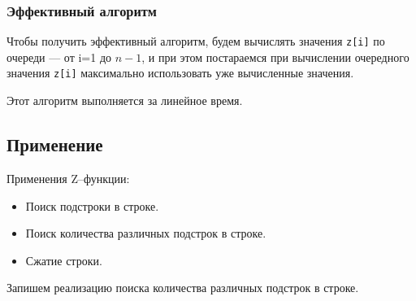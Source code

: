 \subsubsection{Эффективный алгоритм}
Чтобы получить эффективный алгоритм, будем вычислять значения \texttt{z[i]} по очереди — от i=1 до $n-1$, и при этом постараемся при вычислении очередного значения \texttt{z[i]} максимально использовать уже вычисленные значения.
Этот алгоритм выполняется за линейное время.

\subsection{Применение}
Применения Z--функции:
\begin{itemize}
	\item Поиск подстроки в строке.
	\item Поиск количества различных подстрок в строке.
	\item Сжатие строки.
\end{itemize}

Запишем реализацию поиска количества различных подстрок в строке.
